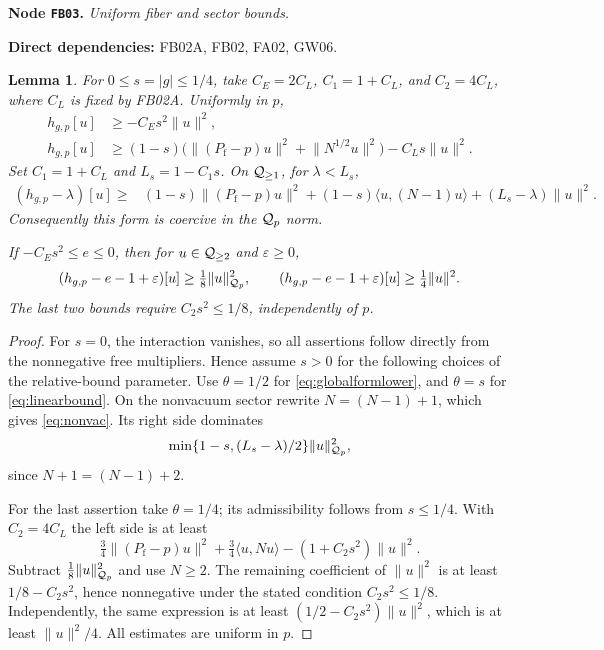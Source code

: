 \documentclass[11pt,a4paper]{article}
\newtheorem{lemma}[theorem]{Lemma}
\theoremstyle{remark}\newtheorem{remark}[theorem]{Remark}
\newcommand{\Pf}{P_{\mathrm f}}\newcommand{\Id}{I}\newcommand{\Dom}{\operatorname{Dom}}
\newcommand{\ip}[2]{\langle #1,#2\rangle}\newcommand{\norm}[1]{\lVert #1\rVert}
\newcommand{\abs}[1]{\lvert #1\rvert}\newcommand{\rankone}[2]{\lvert #1\rangle\langle #2\rvert}
\newcommand{\node}[3]{\par\Needspace{6\baselineskip}\smallskip\hypertarget{node:#1}{}\label{nodepage:#1}\noindent\textbf{Node \texttt{#1}.} \textit{#2.}\par\noindent\textbf{Direct dependencies:} #3.\par}
\begin{document}
\node{FB03}{Uniform fiber and sector bounds}{FB02A, FB02, FA02, GW06}
\begin{lemma}\label{lem:sectorbounds}
For $0\leq s=\abs g\leq1/4$, take $C_E=2C_L$, $C_1=1+C_L$, and $C_2=4C_L$, where $C_L$ is fixed by FB02A. Uniformly in $p$,
\begin{align}
 h_{g,p}[u]&\geq-C_Es^2\norm u^2,\label{eq:globalformlower}\\
 h_{g,p}[u]&\geq(1-s)\bigl(\norm{(\Pf-p)u}^2+\norm{N^{1/2}u}^2\bigr)
                  -C_Ls\norm u^2.\label{eq:linearbound}
\end{align}
Set $C_1=1+C_L$ and $L_s=1-C_1s$. On $\mathcal Q_{\geq1}$, for $\lambda<L_s$,
\begin{align}
 (h_{g,p}-\lambda)[u]
 \geq{}&(1-s)\norm{(\Pf-p)u}^2
 +(1-s)\ip u{(N-1)u}
 +(L_s-\lambda)\norm u^2.\label{eq:nonvac}
\end{align}
Consequently this form is coercive in the $\mathcal Q_p$ norm.

If $-C_Es^2\leq e\leq0$, then for $u\in\mathcal Q_{\geq2}$ and $\varepsilon\geq0$,
\begin{equation}
 (h_{g,p}-e-1+\varepsilon)[u]\geq\tfrac18\norm u_{\Q_p}^2,
 \qquad (h_{g,p}-e-1+\varepsilon)[u]\geq\tfrac14\norm u^2.\label{eq:twosector}
\end{equation}
The last two bounds require $C_2s^2\leq1/8$, independently of $p$.
\end{lemma}
\begin{proof}
For $s=0$, the interaction vanishes, so all assertions follow directly from the nonnegative free multipliers. Hence assume $s>0$ for the following choices of the relative-bound parameter. Use $\theta=1/2$ for \eqref{eq:globalformlower}, and $\theta=s$ for \eqref{eq:linearbound}. On the nonvacuum sector rewrite $N=(N-1)+1$, which gives \eqref{eq:nonvac}. Its right side dominates
\[
 \min\{1-s,(L_s-\lambda)/2\}\norm u_{\Q_p}^2,
\]
since $N+1=(N-1)+2$.

For the last assertion take $\theta=1/4$; its admissibility follows from $s\leq1/4$. With $C_2=4C_L$ the left side is at least
\[
 \tfrac34\norm{(\Pf-p)u}^2+\tfrac34\ip u{Nu}-(1+C_2s^2)\norm u^2.
\]
Subtract $\tfrac18\norm u_{\Q_p}^2$ and use $N\geq2$. The remaining coefficient of $\norm u^2$ is at least $1/8-C_2s^2$, hence nonnegative under the stated condition $C_2s^2\leq1/8$. Independently, the same expression is at least $(1/2-C_2s^2)\norm u^2$, which is at least $\norm u^2/4$. All estimates are uniform in $p$.
\end{proof}
\end{document}
